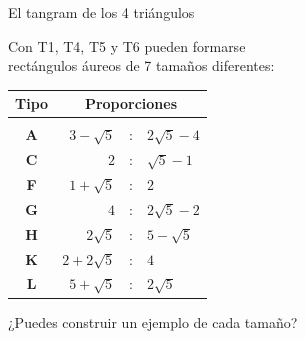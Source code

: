 \documentclass[14pt,aspectratio=169,usenames,dvipsnames]{beamer}
\begin{document}
    \begin{frame}{El tangram de los 4 triángulos}
        \begin{center}
            Con T1, T4, T5 y T6 pueden formarse\\[0.5ex]rectángulos áureos de 7 tamaños diferentes:

            \bigskip\medskip

            {\small\begin{tabular}{c|rcl}
                \textbf{Tipo} & \multicolumn{3}{c}{\textbf{Proporciones}} \\[0.5ex]\hline&&&\\[-1.5ex]
                \textbf{A} & $3\!-\!\sqrt{5}$  &\!\!\!\!:\!\!\!\!& $2\sqrt{5}\!-\!4$ \\
                \textbf{C} & $2$               &\!\!\!\!:\!\!\!\!& $\sqrt{5}\!-\!1$  \\
                \textbf{F} & $1\!+\!\sqrt{5}$  &\!\!\!\!:\!\!\!\!& $2$               \\
                \textbf{G} & $4$               &\!\!\!\!:\!\!\!\!& $2\sqrt{5}\!-\!2$ \\
                \textbf{H} & $2\sqrt{5}$       &\!\!\!\!:\!\!\!\!& $5\!-\!\sqrt{5}$  \\
                \textbf{K} & $2\!+\!2\sqrt{5}$ &\!\!\!\!:\!\!\!\!& $4$               \\
                \textbf{L} & $5\!+\!\sqrt{5}$  &\!\!\!\!:\!\!\!\!& $2\sqrt{5}$       \\
            \end{tabular}}

            \bigskip\medskip

            ¿Puedes construir un ejemplo de cada tamaño?
        \end{center}
    \end{frame}

\end{document}
